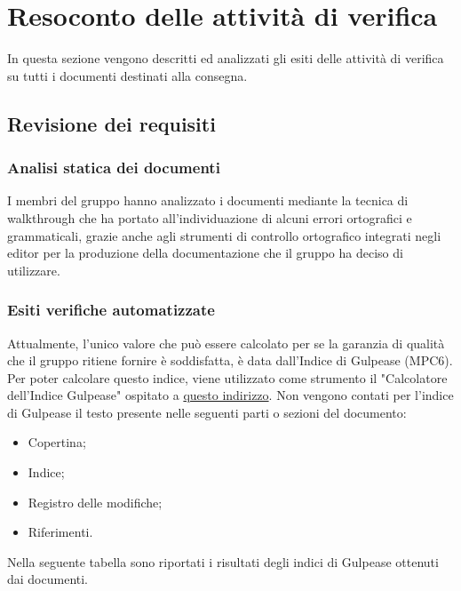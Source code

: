 \section{Resoconto delle attività di verifica}
In questa sezione vengono descritti ed analizzati gli esiti delle attività di verifica su tutti i documenti destinati alla consegna.

\subsection{Revisione dei requisiti}

\subsubsection{Analisi statica dei documenti}
I membri del gruppo \Gruppo{} hanno analizzato i documenti mediante la tecnica di walkthrough che ha portato all'individuazione di 
alcuni errori ortografici e grammaticali, grazie anche agli strumenti di controllo ortografico integrati negli editor per la produzione
della documentazione che il gruppo ha deciso di utilizzare.

\subsubsection{Esiti verifiche automatizzate}
Attualmente, l'unico valore che può essere calcolato per  se la garanzia di qualità che il gruppo ritiene fornire è
soddisfatta, è data dall'Indice di Gulpease (MPC6).
Per poter calcolare questo indice, viene utilizzato come strumento il "Calcolatore dell'Indice Gulpease" ospitato a \href{https://farfalla-project.org/readability_static/}{questo indirizzo}.
Non vengono contati per l'indice di Gulpease il testo presente nelle seguenti parti o sezioni del documento:
\begin{itemize}
    \item Copertina;
    \item Indice;
    \item Registro delle modifiche;
    \item Riferimenti.
\end{itemize}
Nella seguente tabella sono riportati i risultati degli indici di Gulpease ottenuti dai documenti.

